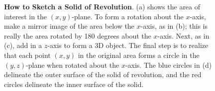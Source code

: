 \begin{figure}[htb]%
\centering
{}%
%
\hfill %
%
	\centering
{}%
    \caption[]{\textbf{How to Sketch a Solid of Revolution}. (a) shows the area of interest in the $(x,y)$-plane. To form a rotation about the $x$-axis, make a mirror image of the area below the $x$-axis, as in (b); this is really the area rotated by 180 degrees about the $x$-axis. Next, as in (c), add in a $z$-axis to form a 3D object. The final step is to realize that each point $(x,y)$ in the original area forms a circle in the $(y,z)$-plane when rotated about the $x$-axis. The blue circles in (d) delineate the outer surface of the solid of revolution, and the red circles delineate the inner surface of the solid.}
    \label{fig:sketchingSolidRevolution}
\end{figure}



